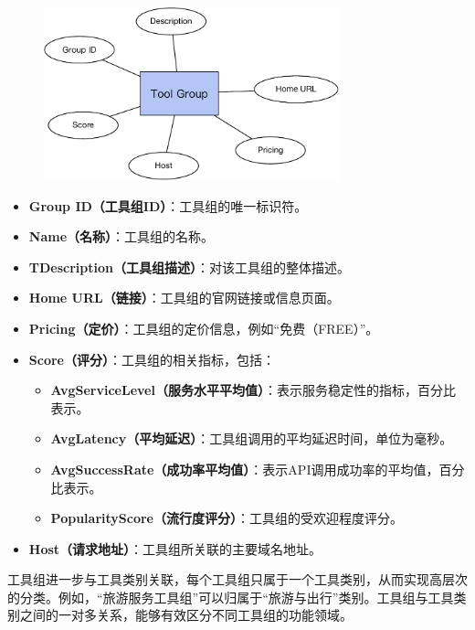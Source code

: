 \begin{figure}[!htp]
    \vspace{1em}
    \centering
    \setlength{\abovecaptionskip}{10pt} %
    \includegraphics[height=5cm]{../assets/图谱格式-tool group.pdf}
    \label{fig:ch3-kg-tool-group}
  \end{figure}

\begin{itemize}
    \item \textbf{Group ID（工具组ID）}：工具组的唯一标识符。
    \item \textbf{Name（名称）}：工具组的名称。
    \item \textbf{TDescription（工具组描述）}：对该工具组的整体描述。
    \item \textbf{Home URL（链接）}：工具组的官网链接或信息页面。
    \item \textbf{Pricing（定价）}：工具组的定价信息，例如``免费（FREE）''。
    \item \textbf{Score（评分）}：工具组的相关指标，包括：
        \begin{itemize}
            \item \textbf{AvgServiceLevel（服务水平平均值）}：表示服务稳定性的指标，百分比表示。
            \item \textbf{AvgLatency（平均延迟）}：工具组调用的平均延迟时间，单位为毫秒。
            \item \textbf{AvgSuccessRate（成功率平均值）}：表示API调用成功率的平均值，百分比表示。
            \item \textbf{PopularityScore（流行度评分）}：工具组的受欢迎程度评分。
        \end{itemize}
    \item \textbf{Host（请求地址）}：工具组所关联的主要域名地址。
\end{itemize}

工具组进一步与工具类别关联，每个工具组只属于一个工具类别，从而实现高层次的分类。例如，“旅游服务工具组”可以归属于“旅游与出行”类别。工具组与工具类别之间的一对多关系，能够有效区分不同工具组的功能领域。

